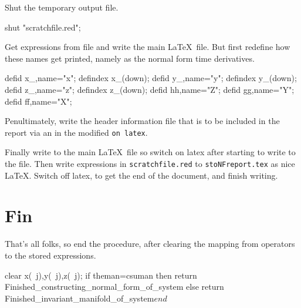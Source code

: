 \documentclass[11pt,a5paper]{article}
\def\ou\big(#1,#2,#3\big)%
\def\eps{\ensuremath{\varepsilon}}
\begin{document}
Shut the temporary output file.
\begin{reduce}
shut "scratchfile.red";
\end{reduce}

Get expressions from file and write the main \LaTeX\ file.
But first redefine how these names get printed, namely as
the normal form time derivatives. 
\begin{reduce}
defid x_,name="x"; defindex x_(down);
defid y_,name="y"; defindex y_(down);
defid z_,name="z"; defindex z_(down);
defid hh,name="\dot Z";
defid gg,name="\dot Y";
defid ff,name="\dot X";
\end{reduce}

Penultimately, write the header information file that is 
to be included in the report via an \verb|| in the 
modified \verb|on latex|.


Finally write to the main \LaTeX\ file so switch on latex
after starting to write to the file. Then write expressions
in \verb|scratchfile.red| to \verb|stoNFreport.tex| as nice
\LaTeX. Switch off latex, to get the end of the document,
and finish writing.


\section{Fin}
That's all folks, so end the procedure, after clearing the
mapping from operators to the stored expressions. 
\begin{reduce}
clear x(~j),y(~j),z(~j);
if theman=csuman 
then return Finished_constructing_normal_form_of_system 
else return Finished_invariant_manifold_of_system$ 
end$
\end{reduce}
\end{document}

